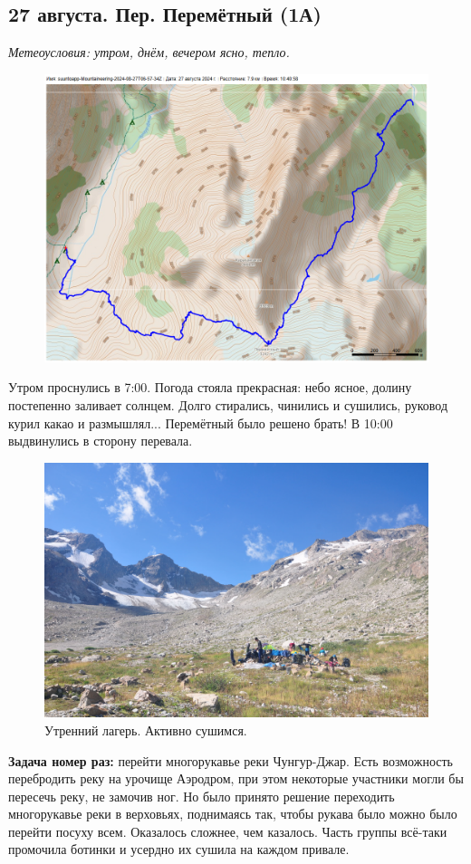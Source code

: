 \subsection{27 августа. Пер. Перемётный (1А)}
\textit{Метеоусловия: утром, днём, вечером ясно, тепло.}

\begin{figure}[h!]
	\centering
	\includegraphics[angle=0, width=0.7\linewidth]{../pics/mini_maps/27}
	\label{fig:mini_27}
\end{figure}

Утром проснулись в 7:00. Погода стояла прекрасная: небо ясное, долину постепенно заливает солнцем. Долго стирались, чинились и сушились, руковод курил какао и размышлял... Перемётный было решено брать!
В 10:00 выдвинулись в сторону перевала.

\begin{figure}[h!]
	\centering
	\includegraphics[width=0.7\linewidth]{../pics/DSC_0251.jpg}
	\caption{Утренний лагерь. Активно сушимся.}
	\label{fig:DSC_0251}
\end{figure}

\textbf{Задача номер раз:} перейти многорукавье реки Чунгур-Джар. Есть возможность перебродить реку на урочище Аэродром, при этом некоторые участники могли бы пересечь реку, не замочив ног. Но было принято решение переходить многорукавье реки в верховьях, поднимаясь так, чтобы рукава было можно было перейти посуху всем. Оказалось сложнее, чем казалось. Часть группы всё-таки промочила ботинки и усердно их сушила на каждом привале. 



